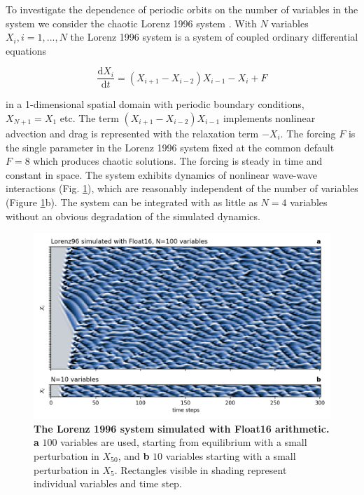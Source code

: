 To investigate the dependence of periodic orbits on the number of variables in the system we consider the chaotic Lorenz 1996 system
\citep{Hatfield2017, Lorenz1998}. With $N$ variables $X_i,i=1,...,N$ the Lorenz 1996 system is a system of coupled ordinary differential
equations

\begin{equation}
	\frac{\mathrm{d}X_i}{\mathrm{d}t} = (X_{i+1} - X_{i-2})X_{i-1} - X_i + F
	\label{eq:lorenz96}
\end{equation}

in a 1-dimensional spatial domain with periodic boundary conditions, $X_{N+1} = X_1$ etc. The term $(X_{i+1} - X_{i-2})X_{i-1}$
implements nonlinear advection and drag is represented with the relaxation term $-X_i$. The forcing $F$ is the single parameter
in the Lorenz 1996 system fixed at the common default $F=8$ which produces chaotic solutions. The forcing is steady in time and
constant in space. The system exhibits dynamics of nonlinear wave-wave interactions (Fig. \ref{fig:orbits_hovmoeller}), which are
reasonably independent of the number of variables (Figure \ref{fig:orbits_hovmoeller}b). The system can be integrated with as little
as $N=4$ variables without an obvious degradation of the simulated dynamics.

\begin{figure}[tbhp]
	\includegraphics[width=1\textwidth]{Figures/orbits/hovmoeller.png}
	\caption{\textbf{The Lorenz 1996 system simulated with Float16 arithmetic. a}
	$100$ variables are used, starting from equilibrium with a small perturbation in $X_{50}$, and
	\textbf{b} $10$ variables starting with a small perturbation in $X_5$. Rectangles visible in shading
	represent individual variables and time step.}
	\label{fig:orbits_hovmoeller}
\end{figure}

